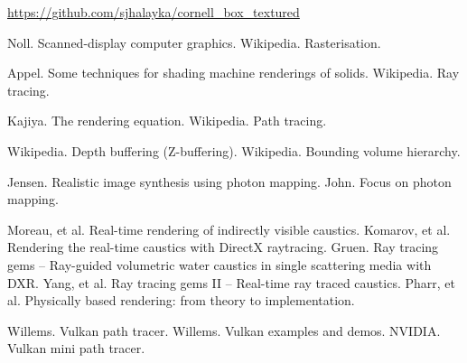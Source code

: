 \documentclass[12pt]{article}
\begin{document}
\url{https://github.com/sjhalayka/cornell_box_textured}




\pagebreak





\begin{thebibliography}{9}

 Noll. Scanned-display computer graphics.
 Wikipedia. Rasterisation.

 Appel. Some techniques for shading machine renderings of solids.
 Wikipedia. Ray tracing.

 Kajiya. The rendering equation.
 Wikipedia. Path tracing.

 Wikipedia. Depth buffering (Z-buffering).
 Wikipedia. Bounding volume hierarchy.


 Jensen. Realistic image synthesis using photon mapping.
 John. Focus on photon mapping.


 Moreau, et al. Real-time rendering of indirectly visible caustics.
 Komarov, et al. Rendering the real-time caustics with DirectX raytracing.
 Gruen. Ray tracing gems -- Ray-guided volumetric water caustics in single scattering media with DXR.
 Yang, et al. Ray tracing gems II -- Real-time ray traced caustics.
 Pharr, et al. Physically based rendering: from theory to implementation.



 Willems. Vulkan path tracer.
 Willems. Vulkan examples and demos.
 NVIDIA. Vulkan mini path tracer.



\end{thebibliography}


\pagebreak
\end{document}
